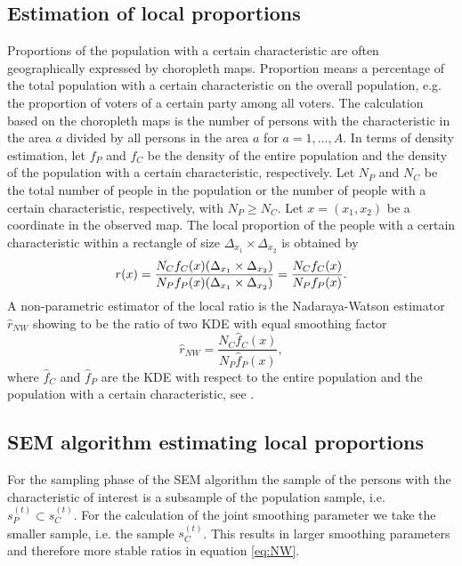 \subsection{Estimation of local proportions}
Proportions of the population with a certain characteristic are often geographically expressed by choropleth maps. Proportion means a percentage of the total population with a certain characteristic on the overall population, e.g. the proportion of voters of a certain party among all voters. 
The calculation based on the choropleth maps is  the number of persons with the characteristic in the area $a$ divided by all persons in the area $a$ for $a = 1, \dots, A$. 
In terms of density estimation, let $f_P$ and $f_C$ be the density of the entire population and the density of the population with 
a certain characteristic, respectively. 
Let $N_P$ and $N_C$ be the total number of people in the population or the number of people with a certain characteristic, respectively, with $N_P \geq N_C$. Let $x = (x_1, x_2)$ be a coordinate in the observed map. The local proportion of the people with a certain characteristic within a rectangle of size $\Delta_{x_1} \times \Delta_{x_2}$ is obtained by 
\begin{equation*}
    r(x) =  \frac{N_C f_C(x) (\Delta_{x_1} \times \Delta_{x_2})}{N_P f_P(x) (\Delta_{x_1} \times \Delta_{x_2})} \\
         =  \frac{N_C f_C(x)}{N_P f_P(x)}. 
\end{equation*}
A non-parametric estimator of the local ratio is the Nadaraya-Watson estimator $\hat{r}_{NW}$ showing to be the ratio of two KDE with equal smoothing factor
\begin{equation}\label{eq:NW}
    \hat{r}_{NW} = \frac{N_C \hat{f}_C(x)}{N_P \hat{f}_P(x)}, 
\end{equation}
where $\hat{f}_C$ and $\hat{f}_P$ are the KDE with respect to the entire population and the population with a certain characteristic, see \cite{Haerdle}. 

\subsection{SEM algorithm estimating local proportions}

For the sampling phase of the SEM algorithm the sample of the persons with the characteristic of interest is a subsample of the population sample, i.e. $s_P^{(t)} \subset s_C^{(t)}$. For the calculation of the joint smoothing parameter we take the smaller sample, i.e. the sample $s_C^{(t)}$. This results in larger smoothing parameters and therefore more stable ratios in equation \ref{eq:NW}.


